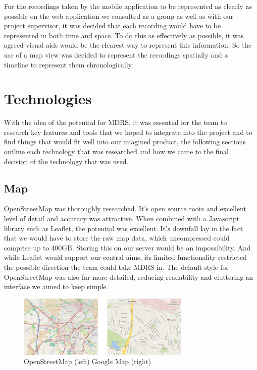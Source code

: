 \documentclass{l3proj}
\begin{document}
For the recordings taken by the mobile application to be represented as clearly as possible on the web application we consulted as a group as well as with our project supervisor, it was decided that each recording would have to be represented in both time and space. To do this as effectively as possible, it was agreed visual aids would be the clearest way to represent this information. So the use of a map view was decided to represent the recordings spatially and a timeline to represent them chronologically.

\section{Technologies}

With the idea of the potential for MDRS, it was essential for the team to research key features and tools that we hoped to integrate into the project and to find things that would fit well into our imagined product, the following sections outline each technology that was researched and how we came to the final decision of the technology that was used.

\subsection{Map}

OpenStreetMap was thoroughly researched. It's open source roots and excellent level of detail and accuracy was attractive. When combined with a Javascript library such as Leaflet, the potential was excellent. It’s downfall lay in the fact that we would have to store the raw map data, which uncompressed could comprise up to 400GB. Storing this on our server would be an impossibility. And while Leaflet would support our central aims, its limited functionality restricted the possible direction the team could take MDRS in. The default style for OpenStreetMap was also far more detailed, reducing readability and cluttering an interface we aimed to keep simple.

\begin{figure}[ht!]
  \centering
\includegraphics[width=0.75\textwidth]{images/openstreetmap_google-map.jpg}
\caption{OpenStreetMap (left) Google Map (right)}
\end{figure}
\end{document}
